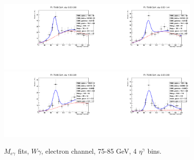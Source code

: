 \begin{figure}[htb]
  \begin{center}
   \includegraphics[width=0.45\textwidth]{../figs/figs_v11/ELECTRON_WGamma/EtoGammaFits/sa_hZmass_h_Data_EtoGamma_Enr_BARREL_pt75to85_ieta0.pdf}\includegraphics[width=0.45\textwidth]{../figs/figs_v11/ELECTRON_WGamma/EtoGammaFits/sa_hZmass_h_Data_EtoGamma_Enr_BARREL_pt75to85_ieta1.pdf}\\
   \includegraphics[width=0.45\textwidth]{../figs/figs_v11/ELECTRON_WGamma/EtoGammaFits/sa_hZmass_h_Data_EtoGamma_Enr_ENDCAP_pt75to85_ieta0.pdf}\includegraphics[width=0.45\textwidth]{../figs/figs_v11/ELECTRON_WGamma/EtoGammaFits/sa_hZmass_h_Data_EtoGamma_Enr_ENDCAP_pt75to85_ieta1.pdf}\\
  \label{fig:etogFits_75to85}
  \caption{$M_{e\gamma}$ fits, $W\gamma$, electron channel, 75-85 GeV, 4 $\eta^{\gamma}$ bins.}
  \end{center}
\end{figure}

